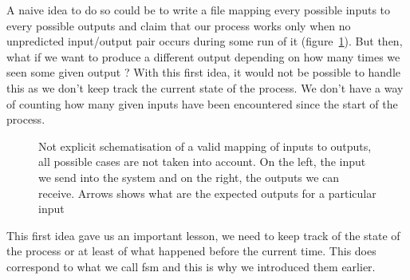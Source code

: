 \documentclass[12pt]{article}
\theoremstyle{definition}
\theoremstyle{definition}
\begin{document}
A naive idea to do so could be to write a file mapping every possible inputs to every possible outputs and claim that our process works only when no unpredicted input/output pair occurs during some run of it (figure~\ref{io_map1}). But then, what if we want to produce a different output depending on how many times we seen some given output ? With this first idea, it would not be possible to handle this as we don't keep track the current state of the process. We don't have a way of counting how many given inputs have been encountered since the start of the process.\\

\begin{figure}
    \centering

    \caption{Not explicit schematisation of a valid mapping of inputs to outputs, all possible cases are not taken into account. On the left, the input we send into the system and on the right, the outputs we can receive. Arrows shows what are the expected outputs for a particular input}
    \label{io_map1}
\end{figure}

This first idea gave us an important lesson, we need to keep track of the state of the process or at least of what happened before the current time. This does correspond to what we call \gls{fsm} and this is why we introduced them earlier.\\
\end{document}
